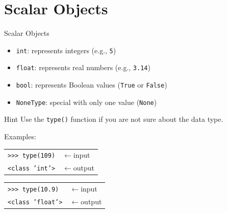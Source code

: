 \documentclass[t,handout,9pt]{beamer}
\begin{document}
\section{Scalar Objects}
\begin{frame}{Scalar Objects}
\begin{itemize}
	\item \texttt{int}: represents integers (e.g., \texttt{5})
	\item \texttt{float}: represents real numbers (e.g., \texttt{3.14})
	\item \texttt{bool}: represents Boolean values (\texttt{True} or \texttt{False})
	\item \texttt{NoneType}: special with only one value (\texttt{None})
\end{itemize}
\begin{block}{Hint}
Use the \texttt{type()} function if you are not sure about the data type.
\end{block}
Examples:
\begin{table}[]
\begin{tabular}{ll}
\texttt{>{}>{}> type(109)} & $\leftarrow$input  \\
\texttt{<class 'int'>}        & $\leftarrow$output
\end{tabular}
\end{table}
\begin{table}[]
\begin{tabular}{ll}
\texttt{>{}>{}> type(10.9)} & $\leftarrow$input  \\
\texttt{<class 'float'>}        & $\leftarrow$output
\end{tabular}
\end{table}
\end{frame}
%
\end{document}
